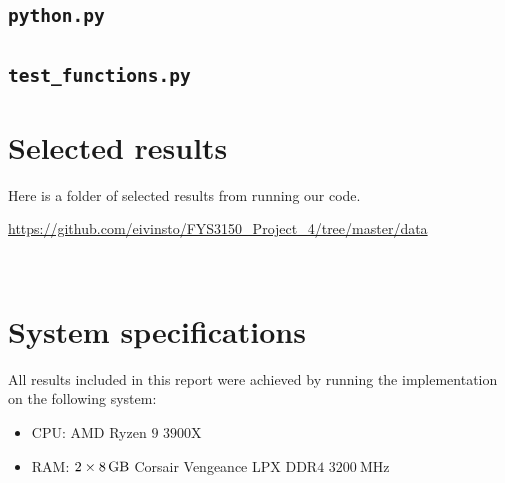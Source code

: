 \documentclass[reprint,english,notitlepage]{revtex4-1}  %
\begin{document}
\cprotect\subsection{\verb+python.py+} \label{A.4}

\cprotect\subsection{\verb+test_functions.py+} \label{A.5}

\newpage
\section{Selected results} \label{B}
Here is a folder of selected results from running our code.

\url{https://github.com/eivinsto/FYS3150_Project_4/tree/master/data}

~
\newpage
\section{System specifications} \label{C}
All results included in this report were achieved by running the implementation on the following system:

\begin{itemize}
	\item CPU: AMD Ryzen \(9\) \(3900\)X
	\item RAM: \(2\times\SI{8}{\giga\byte}\) Corsair Vengeance LPX DDR\(4\) \(\SI{3200}{\mega\hertz}\)
\end{itemize}
\end{document}
